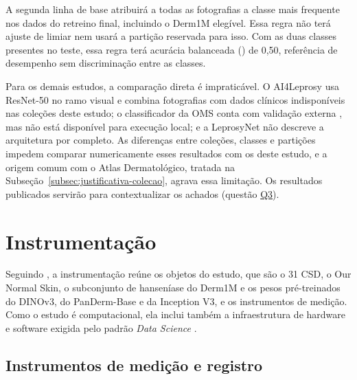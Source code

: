 A segunda linha de base atribuirá a todas as fotografias a classe mais
frequente nos dados do retreino final, incluindo o Derm1M elegível. Essa
regra não terá ajuste de limiar nem usará a partição reservada para isso.
Com as duas classes presentes no
teste, essa regra terá acurácia balanceada () de 0,50,
referência de desempenho sem discriminação entre as classes.

Para os demais estudos, a comparação direta é impraticável. O AI4Leprosy
\cite{barbieri2022} usa ResNet-50 no ramo visual e combina fotografias com
dados clínicos indisponíveis nas coleções deste estudo; o classificador da
OMS \cite{pons2026} conta com validação externa \cite{deps2026}, mas não
está disponível para execução local; e a LeprosyNet \cite{baweja2023} não
descreve a arquitetura por completo. As diferenças entre coleções, classes
e partições impedem comparar numericamente esses resultados com os deste
estudo, e a origem comum com o Atlas Dermatológico, tratada na
Subseção~\ref{subsec:justificativa-colecao}, agrava essa limitação. Os resultados publicados servirão para contextualizar os
achados (questão \hyperlink{questao-q3}{Q3}).

\section{Instrumentação}
\label{sec:instrumentacao}

Seguindo , a instrumentação reúne os objetos do
estudo, que são o 31 CSD, o Our Normal Skin, o subconjunto de hanseníase do Derm1M e os pesos pré-treinados do DINOv3, do PanDerm-Base e da Inception
V3, e os instrumentos
de medição. Como o estudo é computacional, ela inclui também a
infraestrutura de hardware e software exigida pelo padrão \textit{Data
	Science} \cite{acmSigsoftDataScience}.

\subsection{Instrumentos de medição e registro}
\label{subsec:instrumentos-medicao}


